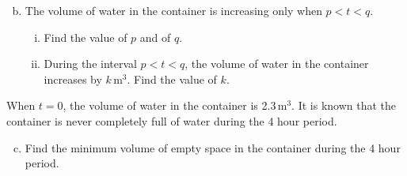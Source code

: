 \documentclass[12pt, twoside]{article}
\begin{document}
\begin{enumerate}
\begin{enumerate}[(a)]
    \setcounter{enumii}{1}
    \item The volume of water in the container is increasing only when $p < t < q$.
    \begin{enumerate}[(i)]
        \item Find the value of $p$ and of $q$.
        \item During the interval $p < t < q$, the volume of water in the container increases by $k$\,m$^3$. Find the value of $k$.
    \end{enumerate}
\end{enumerate}

When $t = 0$, the volume of water in the container is 2.3\,m$^3$. It is known that the container is never completely full of water during the 4 hour period.

\begin{enumerate}[(a)]
    \setcounter{enumii}{2}
    \item Find the minimum volume of empty space in the container during the 4 hour period.
\end{enumerate}

\end{enumerate}
\end{document}
